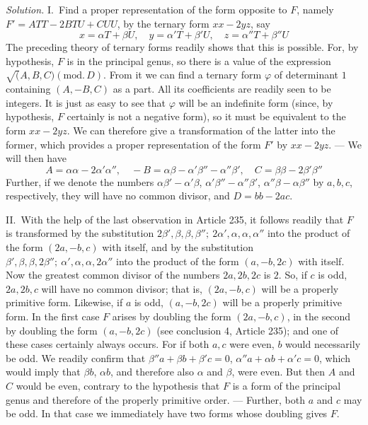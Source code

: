 \textit{Solution.} I.\ Find a proper representation of the form opposite
to $F$, namely $F'=ATT-2BTU+CUU$, by the ternary form $xx-2yz$, say
\[
x=\alpha T+\beta U,\quad y=\alpha'T+\beta'U,\quad z=\alpha''T+\beta''U
\]
The preceding theory of ternary forms readily shows that this is possible.
For, by hypothesis, $F$ is in the principal genus, so there is a
value of the expression $\surd(A,\allowbreak B,\allowbreak C)(\mathrm{mod.}\,\allowbreak D)$. From it we can find a ternary form
$\varphi$ of determinant $1$ containing $(A,-B,C)$ as a part. All its
coefficients are readily seen to be integers. It is just as easy to see
that $\varphi$ will be an indefinite form (since, by hypothesis, $F$
certainly is not a negative form), so it must be equivalent to the form
$xx-2yz$. We can therefore give a transformation of the latter into the
former, which provides a proper representation of the form $F'$
by $xx-2yz$. --- We will then have
\[
A=\alpha\alpha-2\alpha'\alpha'',\quad -B=\alpha\beta-\alpha'\beta''-\alpha''\beta',\quad C=\beta\beta-2\beta'\beta''
\]
Further, if we denote the numbers $\alpha\beta'-\alpha'\beta$, $\alpha'\beta''-\alpha''\beta'$, $\alpha''\beta-\alpha\beta''$ by $a,b,c$,
respectively, they will have no common divisor, and $D=bb-2ac$.

II.\ With the help of the last observation in Article 235, it follows
readily that $F$ is transformed by the substitution $2\beta',\allowbreak \beta,\allowbreak \beta,\allowbreak \beta'';\ 2\alpha',\allowbreak \alpha,\allowbreak \alpha,\allowbreak \alpha''$ into
the product of the form $(2a,-b,c)$ with itself, and by the substitution
$\beta',\allowbreak \beta,\allowbreak \beta,\allowbreak 2\beta'';\ \alpha',\allowbreak \alpha,\allowbreak \alpha,\allowbreak 2\alpha''$ into the product of the form $(a,-b,2c)$ with itself. Now the
greatest common divisor of the numbers $2a,2b,2c$ is $2$. So, if
$c$ is odd, $2a,2b,c$ will have no common divisor; that is, $(2a,-b,c)$ will
be a properly primitive form. Likewise, if $a$ is odd, $(a,-b,2c)$
will be a properly primitive form. In the first case $F$ arises
by doubling the form $(2a,-b,c)$, in the second by doubling the form
$(a,-b,2c)$ (see conclusion 4, Article 235); and one of these cases certainly
always occurs. For if both $a,c$ were even, $b$ would necessarily
be odd. We readily confirm that $\beta''a+\beta b+\beta'c=0$, $\alpha''a+\alpha b+\alpha'c=0$, which would imply
that $\beta b$, $\alpha b$, and therefore also $\alpha$ and $\beta$, were
even. But then $A$ and $C$ would be even, contrary to the
hypothesis that $F$ is a form of the principal genus and therefore
of the properly primitive order. --- Further, both $a$ and $c$
may be odd. In that case we immediately have two forms whose doubling
gives $F$.

